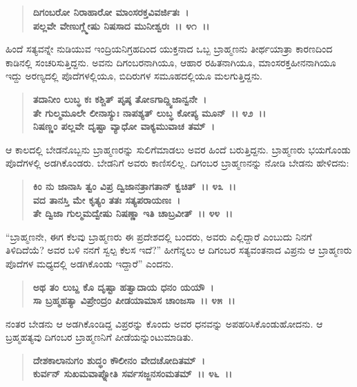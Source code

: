 \begin{verse}
\textbf{ದಿಗಂಬರೋ ನಿರಾಹಾರೋ ಮಾಂಸರಕ್ತವಿವರ್ಜಿತಃ~।}\\\textbf{ಪಲ್ಲವೇ ವೇಣುಗ್ಲ್ಮೇಷು ನಿಷಸಾದ ಮುನೀಶ್ವರಃ~।। ೪೧~।।}
\end{verse}

ಹಿಂದೆ ಸತ್ಯವನ್ನೇ ನುಡಿಯುವ ಇಂದ್ರಿಯನಿಗ್ರಹದಿಂದ ಯುಕ್ತನಾದ ಒಬ್ಬ ಬ್ರಾಹ್ಮಣನು ತೀರ್ಥಯಾತ್ರಾ ಕಾರಣದಿಂದ ಕಾಡಿನಲ್ಲಿ ಸಂಚರಿಸುತ್ತಿದ್ದನು. ಅವನು ದಿಗಂಬರನಾಗಿಯೂ, ಆಹಾರ ರಹಿತನಾಗಿಯೂ, ಮಾಂಸರಕ್ತಹೀನನಾಗಿಯೂ ಇದ್ದು ಅರಣ್ಯದಲ್ಲಿ ಪೊದೆಗಳಲ್ಲಿಯೂ, ಬಿದಿರುಗಳ ಸಮೂಹದಲ್ಲಿಯೂ ಮಲಗುತ್ತಿದ್ದನು.

\begin{verse}
\textbf{ತದಾನೀಂ ಲುಬ್ಧ ಕಃ ಕಶ್ಚಿತ್ ಪೃಷ್ಠ ತೋಽಗಾದ್ದ್ವಿಜಾನ್ವನೇ~।}\\\textbf{ತೇ ಗುಲ್ಮಮೂಲೇ ಲೀನಾಸ್ಯುಃ ನಾಪಶ್ಯತ್ ಲುಬ್ಧ ಕೋಪ್ಯ ಮೂನ್~।। ೪೨~।।}\\\textbf{ನಿಷಣ್ಣಂ ಪಲ್ಲವೇ ದೃಷ್ಟಾ ವ್ಯಾಧೋ ವಾಕ್ಯಮುವಾಚ ತಮ್~।}
\end{verse}

ಆ ಕಾಲದಲ್ಲಿ ಬೇಡನೊಬ್ಬನು ಬ್ರಾಹ್ಮಣರನ್ನು ಸುಲಿಗೆಮಾಡಲು ಅವರ ಹಿಂದೆ ಬರುತ್ತಿದ್ದನು. ಬ್ರಾಹ್ಮಣರು ಭಯಗೊಂಡು ಪೊದೆಗಳಲ್ಲಿ ಅಡಗಿಕೊಂಡರು. ಬೇಡನಿಗೆ ಅವರು ಕಾಣಿಸಲಿಲ್ಲ. ದಿಗಂಬರ ಬ್ರಾಹ್ಮಣನನ್ನು ನೋಡಿ ಬೇಡನು ಹೇಳಿದನು:

\begin{verse}
\textbf{ಕಿಂ ನು ಜಾನಾಸಿ ತ್ವಂ ವಿಪ್ರ ದ್ವಿಜಾನತ್ರಾಗತಾನ್ ಕ್ವಚಿತ್~।। ೪೩~।।}\\\textbf{ವದ ತಾನಸ್ತಿ ಮೇ ಕೃತ್ಯಂ ತತಃ ಸತ್ಯಪರಾಯಣಃ~। }\\\textbf{ತೇ ದ್ವಿಜಾ ಗುಲ್ಮಮದ್ವೇಷು ನಿಷಣ್ಣಾ ಇತಿ ಚಾಬ್ರವೀತ್~।। ೪೪~।।}
\end{verse}

“ಬ್ರಾಹ್ಮಣನೇ, ಈಗ ಕೆಲವು ಬ್ರಾಹ್ಮಣರು ಈ ಪ್ರದೇಶದಲ್ಲಿ ಬಂದರು, ಅವರು ಎಲ್ಲಿದ್ದಾರೆ ಎಂಬುದು ನಿನಗೆ ತಿಳಿದಿದೆಯೆ? ಅವರ ಬಳಿ ನನಗೆ ಸ್ವಲ್ಪ ಕೆಲಸ ಇದೆ?” ಹೀಗೆನ್ನಲು ಆ ದಿಗಂಬರ ಸತ್ಯವಂತನಾದ ವಿಪ್ರನು ಆ ಬ್ರಾಹ್ಮಣರು ಪೊದೆಗಳ ಮಧ್ಯದಲ್ಲಿ ಅಡಗಿಕೊಂಡು ಇದ್ದಾರೆ” ಎಂದನು.

\begin{verse}
\textbf{ಅಥ ತಂ ಲುಬ್ದ ಕೊ ದೃಷ್ಟಾ ಹತ್ವಾದಾಯ ಧನಂ ಯಯೌ~।}\\\textbf{ಸಾ ಬ್ರಹ್ಮಹತ್ಯಾ ವಿಪ್ರೇಂದ್ರಂ ಪೀಡಯಾಮಾಸ ಚಾಂಜಸಾ~।। ೪೫~।।}
\end{verse}

ನಂತರ ಬೇಡನು ಆ ಅಡಗಿಕೊಂಡಿದ್ದ ವಿಪ್ರರನ್ನು ಕೊಂದು ಅವರ ಧನವನ್ನು ಅಪಹರಿಸಿಕೊಂಡುಹೋದನು. ಆ ಬ್ರಹ್ಮಹತ್ಯವು ದಿಗಂಬರ ಬ್ರಾಹ್ಮಣನಿಗೆ ಪೀಡೆಯನ್ನುಂಟುಮಾಡಿತು.

\begin{verse}
\textbf{ದೇಶಕಾಲಾನುಗಂ ಶುದ್ಧಂ ಕೌಲೀನಂ ವೇದಚೋದಿತಮ್~।}\\\textbf{ಕುರ್ವನ್ ಸುಖಮವಾಪ್ನೋತಿ ಸರ್ವಸಜ್ಜನಸಂಮತಮ್~।। ೪೬~।। }
\end{verse}

